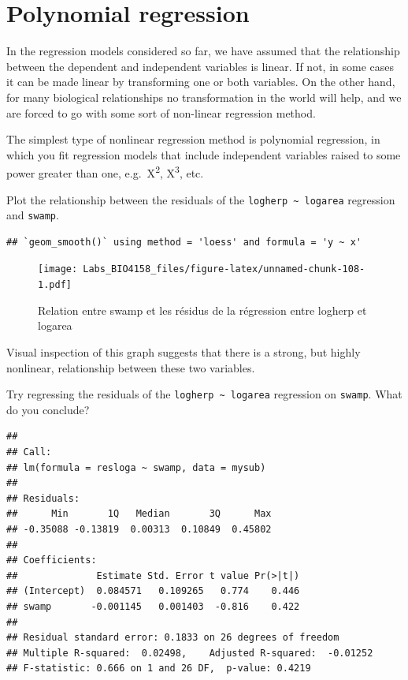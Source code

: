 \documentclass[
  12pt,
]{book}
\makeatletter
\newenvironment{kframe}{%
\medskip{}
\setlength{\fboxsep}{.8em}
\def\at@end@of@kframe{}%
\ifinner\ifhmode%
 \def\at@end@of@kframe{\end{minipage}}%
 \begin{minipage}{\columnwidth}%
\fi\fi%
\def\FrameCommand##1{\hskip\@totalleftmargin \hskip-\fboxsep
\colorbox{incolor}{##1}\hskip-\fboxsep
    \hskip-\linewidth \hskip-\@totalleftmargin \hskip\columnwidth}%
\MakeFramed {\advance\hsize-\width
  \@totalleftmargin\z@ \linewidth\hsize
  \@setminipage}}%
{\par\unskip\endMakeFramed%
\at@end@of@kframe}
\newenvironment{rmdblock}[1]
 {
 \begin{itemize}
 \renewcommand{\labelitemi}{
   \raisebox{-.7\height}[0pt][0pt]{
     {\setkeys{Gin}{width=3em,keepaspectratio}\texttt{[image: images/\#1]}}
   }
 }
 \begin{kframe}
 \setlength{\fboxsep}{1em}
 \item
 }
 {
 \end{kframe}
 \end{itemize}
 }
\newenvironment{rmdcode}
  {\begin{rmdblock}{screen}}
  {\end{rmdblock}}
\makeatother
\begin{document}
\hypertarget{polynomial-regression}{%
\section{Polynomial regression}\label{polynomial-regression}}

In the regression models considered so far, we have assumed that the relationship between the dependent and independent variables is linear. If not, in some cases it can be made linear by transforming one or both variables. On the other hand, for many biological relationships no transformation in the world will help, and we are forced to go with some sort of non-linear regression method.

The simplest type of nonlinear regression method is polynomial regression, in which you fit regression models that include independent variables raised to some power greater than one, e.g.~X\textsuperscript{2},
X\textsuperscript{3}, etc.

\begin{rmdcode}
Plot the relationship between the residuals of the \texttt{logherp\ \textasciitilde{}\ logarea}
regression and \texttt{swamp}.
\end{rmdcode}

\begin{verbatim}
## `geom_smooth()` using method = 'loess' and formula = 'y ~ x'
\end{verbatim}

\begin{figure}
\centering
\texttt{[image: Labs\_BIO4158\_files/figure-latex/unnamed-chunk-108-1.pdf]}
\caption{\label{fig:unnamed-chunk-108}Relation entre swamp et les résidus de la régression entre logherp et logarea}
\end{figure}

Visual inspection of this graph suggests that there is a strong, but highly nonlinear, relationship between these two variables.

\begin{rmdcode}
Try regressing the residuals of the \texttt{logherp\ \textasciitilde{}\ logarea} regression on \texttt{swamp}.
What do you conclude?
\end{rmdcode}

\begin{verbatim}
## 
## Call:
## lm(formula = resloga ~ swamp, data = mysub)
## 
## Residuals:
##      Min       1Q   Median       3Q      Max 
## -0.35088 -0.13819  0.00313  0.10849  0.45802 
## 
## Coefficients:
##              Estimate Std. Error t value Pr(>|t|)
## (Intercept)  0.084571   0.109265   0.774    0.446
## swamp       -0.001145   0.001403  -0.816    0.422
## 
## Residual standard error: 0.1833 on 26 degrees of freedom
## Multiple R-squared:  0.02498,    Adjusted R-squared:  -0.01252 
## F-statistic: 0.666 on 1 and 26 DF,  p-value: 0.4219
\end{verbatim}
\end{document}
